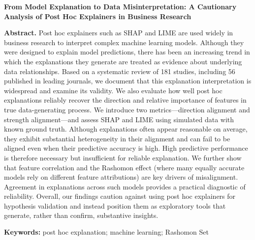 \documentclass[11pt]{article}
\begin{document}
\begin{center}
    {\Large \textbf{From Model Explanation to Data Misinterpretation: A Cautionary Analysis of Post Hoc Explainers in Business Research}}
\end{center}

\vspace{0.5em}

\noindent
\textbf{Abstract.}
Post hoc explainers such as SHAP and LIME are used widely in business research to interpret complex machine learning models. Although they were designed to explain model predictions, there has been an increasing trend in which the explanations they generate are treated as evidence about underlying data relationships. Based on a systematic review of 181 studies, including 56 published in leading journals, we document that this explanation interpretation is widespread and examine its validity.
We also evaluate how well post hoc explanations reliably recover the direction and relative importance of features in true data-generating process. We introduce two metrics—direction alignment and strength alignment—and assess SHAP and LIME using simulated data with known ground truth. Although explanations often appear reasonable on average, they exhibit substantial heterogeneity in their alignment and can fail to be aligned even when their predictive accuracy is high. High predictive performance is therefore necessary but insufficient for reliable explanation.
We further show that feature correlation and the Rashomon effect (where many equally accurate models rely on different feature attributions) are key drivers of misalignment. Agreement in explanations across such models provides a practical diagnostic of reliability. Overall, our findings caution against using post hoc explainers for hypothesis validation and instead position them as exploratory tools that generate, rather than confirm, substantive insights.

\vspace{0.5em}

\noindent
\textbf{Keywords:}
post hoc explanation; machine learning; Rashomon Set




%
\end{document}
